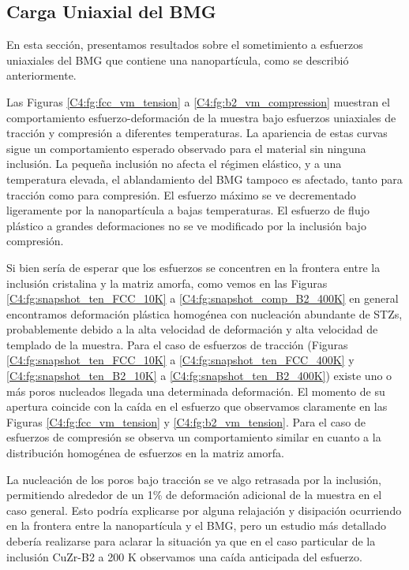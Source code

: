\subsection{Carga Uniaxial del BMG}
\label{S4_3_2}

En esta sección, presentamos resultados sobre el sometimiento a esfuerzos uniaxiales del BMG que contiene una nanopartícula, como se describió anteriormente.

Las Figuras \ref{C4:fg:fcc_vm_tension} a \ref{C4:fg:b2_vm_compression} muestran el comportamiento esfuerzo-deformación de la muestra bajo esfuerzos uniaxiales de tracción y compresión a diferentes temperaturas. La apariencia de estas curvas sigue un comportamiento esperado observado para el material sin ninguna inclusión. La pequeña inclusión no afecta el régimen elástico, y a una temperatura elevada, el ablandamiento del BMG tampoco es afectado, tanto para tracción como para compresión. El esfuerzo máximo se ve decrementado ligeramente por la nanopartícula a bajas temperaturas. El esfuerzo de flujo plástico a grandes deformaciones no se ve modificado por la inclusión bajo compresión.

Si bien sería de esperar que los esfuerzos se concentren en la frontera entre la inclusión cristalina y la matriz amorfa, como vemos en las Figuras \ref{C4:fg:snapshot_ten_FCC_10K} a \ref{C4:fg:snapshot_comp_B2_400K} en general encontramos deformación plástica homogénea con nucleación abundante de STZs, probablemente debido a la alta velocidad de deformación y alta velocidad de templado de la muestra. Para el caso de esfuerzos de tracción (Figuras \ref{C4:fg:snapshot_ten_FCC_10K} a \ref{C4:fg:snapshot_ten_FCC_400K} y \ref{C4:fg:snapshot_ten_B2_10K} a \ref{C4:fg:snapshot_ten_B2_400K}) existe uno o más poros nucleados llegada una determinada deformación. El momento de su apertura coincide con la caída en el esfuerzo que observamos claramente en las Figuras \ref{C4:fg:fcc_vm_tension} y \ref{C4:fg:b2_vm_tension}. Para el caso de esfuerzos de compresión se observa un comportamiento similar en cuanto a la distribución homogénea de esfuerzos en la matriz amorfa.

La nucleación de los poros bajo tracción se ve algo retrasada por la inclusión, permitiendo alrededor de un 1\% de deformación adicional de la muestra en el caso general. Esto podría explicarse por alguna relajación y disipación ocurriendo en la frontera entre la nanopartícula y el BMG, pero un estudio más detallado debería realizarse para aclarar la situación ya que en el caso particular de la inclusión CuZr-B2 a 200 K observamos una caída anticipada del esfuerzo.

